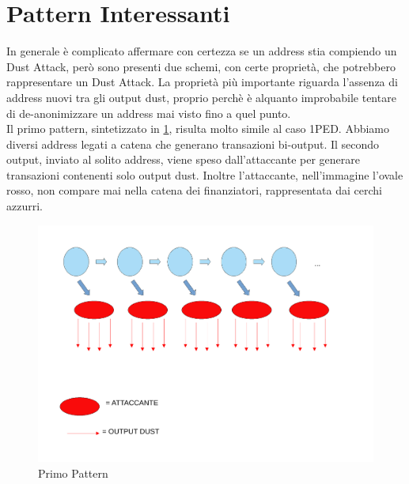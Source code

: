 \section{Pattern Interessanti}
In generale è complicato affermare con certezza se un address stia compiendo un Dust Attack, però sono presenti due schemi, con certe proprietà, che potrebbero rappresentare un Dust Attack. La proprietà più importante riguarda l'assenza di address nuovi tra gli output dust, proprio perchè è alquanto improbabile tentare di de-anonimizzare un address mai visto fino a quel punto.\\
Il primo pattern, sintetizzato in \ref{fig:schema1}, risulta molto simile al caso 1PED. Abbiamo diversi address legati a catena che generano transazioni bi-output. Il secondo output, inviato al solito address, viene speso dall'attaccante per generare transazioni contenenti solo output dust. Inoltre l'attaccante, nell'immagine l'ovale rosso, non compare mai nella catena dei finanziatori, rappresentata dai cerchi azzurri.
\begin{figure}[h!]
    \centering
    \includegraphics[scale=0.4]{Images/dust_attack1.pdf}
    \caption{Primo Pattern}
    \label{fig:schema1}
\end{figure}
\FloatBarrier
